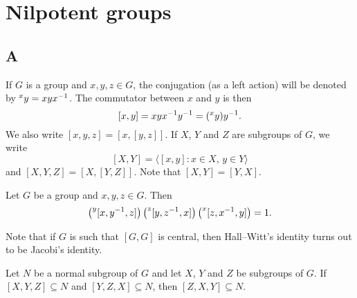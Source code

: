 \chapter{Nilpotent groups}

\section*{A}

If $G$ is a group and $x,y,z\in G$, the conjugation (as a left action) will be denoted
by $\prescript{x}{}y=xyx^{-1}$. The commutator between $x$ and $y$ is then 
\[
[x,y]=xyx^{-1}y^{-1}=(\prescript{x}{}y)y^{-1}.
\]
We also write 
$[x,y,z]=[x,[y,z]]$. 
If $X$, $Y$ and $Z$ are subgroups of $G$, we write 
\[
[X,Y]=\langle [x,y]:x\in X,\,y\in Y\rangle
\]
and $[X,Y,Z]=\left[ X,[Y,Z] \right]$. Note that $[X,Y]=[Y,X]$. 

\begin{exercise}
	\label{xca:HallWitt}
	Let $G$ be a group and $x,y,z\in G$. Then 
	\begin{equation}
		\label{eq:HallWitt}
	\left(\prescript{y}{}[x,y^{-1},z]\right)\left(\prescript{z}{}[y,z^{-1},x]\right)\left(\prescript{x}{}[z,x^{-1},y]\right)=1.
	\end{equation}
\end{exercise}

Note that if $G$ is such that $[G,G]$ is central, then Hall--Witt's identity 
turns out to be Jacobi's identity. 

%

\begin{lemma}
	\label{lemma:3subgrupos_general}
	Let $N$ be a normal subgroup of $G$ and let $X$, $Y$ and $Z$
	be subgroups of $G$. If $[X,Y,Z]\subseteq N$ and $[Y,Z,X]\subseteq N$, then 
	$[Z,X,Y]\subseteq N$.
\end{lemma}

